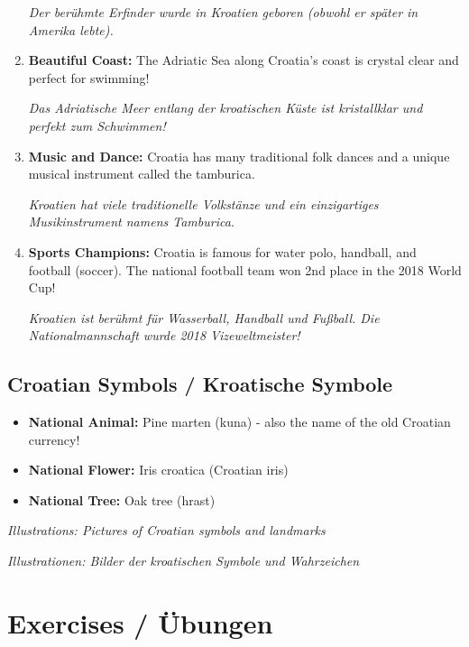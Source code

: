 \begin{culture}
\begin{enumerate}
    \textit{Der berühmte Erfinder wurde in Kroatien geboren (obwohl er später in Amerika lebte).}
    
    \item \textbf{Beautiful Coast:} The Adriatic Sea along Croatia's coast is crystal clear and perfect for swimming!
    
    \textit{Das Adriatische Meer entlang der kroatischen Küste ist kristallklar und perfekt zum Schwimmen!}
    
    \item \textbf{Music and Dance:} Croatia has many traditional folk dances and a unique musical instrument called the tamburica.
    
    \textit{Kroatien hat viele traditionelle Volkstänze und ein einzigartiges Musikinstrument namens Tamburica.}
    
    \item \textbf{Sports Champions:} Croatia is famous for water polo, handball, and football (soccer). The national football team won 2nd place in the 2018 World Cup!
    
    \textit{Kroatien ist berühmt für Wasserball, Handball und Fußball. Die Nationalmannschaft wurde 2018 Vizeweltmeister!}
\end{enumerate}

\subsection*{Croatian Symbols / Kroatische Symbole}

\begin{itemize}
    \item \textbf{National Animal:} Pine marten (kuna) - also the name of the old Croatian currency!
    \item \textbf{National Flower:} Iris croatica (Croatian iris)
    \item \textbf{National Tree:} Oak tree (hrast)
\end{itemize}

\textit{Illustrations: Pictures of Croatian symbols and landmarks}

\textit{Illustrationen: Bilder der kroatischen Symbole und Wahrzeichen}
\end{culture}

\section{Exercises / Übungen}

